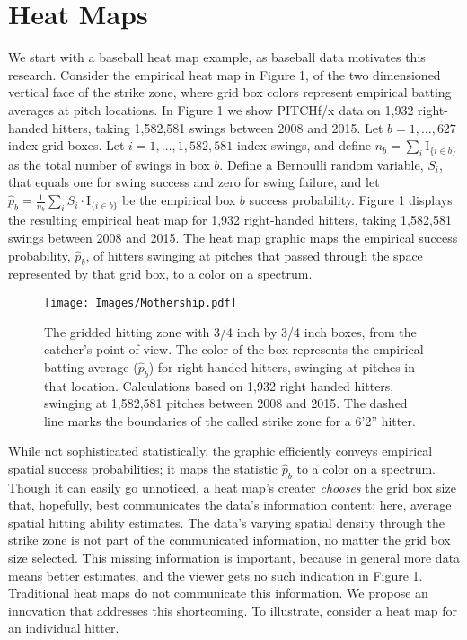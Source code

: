 \documentclass{article}
\begin{document}
\section{Heat Maps} %

We start with a baseball heat map example, as baseball data motivates this research. Consider the empirical heat map in Figure 1, of the two dimensioned vertical face of the strike zone, where grid box colors represent empirical batting averages at pitch locations. In Figure 1 we show PITCHf/x\textsuperscript{\textregistered} data on 1,932 right-handed hitters, taking 1,582,581 swings between 2008 and 2015.  Let $b = 1, \dots, 627$ index grid boxes. Let $i = 1, \dots, 1,582,581$ index swings, and define $n_{b} = \displaystyle\sum_{i} \text{I}_{\{i \in b \}}$ as the total number of swings in box $b$.
Define a Bernoulli random variable, $S_{i}$, that equals one for swing success and zero for swing failure, and let $\hat{p}_{b} = \frac{1}{n_{b}} \displaystyle\sum_{i} S_{i} \cdot \text{I}_{\{i \in b \}}$ be the empirical box $b$ success probability. Figure 1 displays the resulting empirical heat map for 1,932 right-handed hitters, taking 1,582,581 swings between 2008 and 2015. The heat map graphic maps the empirical success probability, $\hat{p}_{b}$, of hitters swinging at pitches that passed through the space represented by that grid box, to a color on a spectrum.
  \begin{figure}[H]
	\centering
	\texttt{[image: Images/Mothership.pdf]} 
  \caption{The gridded hitting zone with 3/4 inch by 3/4 inch boxes, from the catcher's point of view. The color of the box represents the empirical batting average ($\hat{p}_{b}$) for right handed hitters, swinging at pitches in that location. Calculations based on 1,932 right handed hitters, swinging at 1,582,581 pitches between 2008 and 2015. The dashed line marks the boundaries of the called strike zone for a 6'2'' hitter.}
	\end{figure} 
\noindent While not sophisticated statistically, the graphic efficiently conveys empirical spatial success probabilities; it maps the statistic $\hat{p}_{b}$ to a color on a spectrum. Though it can easily go unnoticed, a heat map's creater {\it chooses} the grid box size that, hopefully, best communicates the data's information content; here, average spatial hitting ability estimates. The data's varying spatial density through the strike zone is not part of the communicated information, no matter the grid box size selected. This missing information is important, because in general more data means better estimates, and the viewer gets no such indication in Figure 1. Traditional heat maps do not communicate this information. We propose an innovation that addresses this shortcoming. To illustrate, consider a heat map for an individual hitter.
\end{document}
